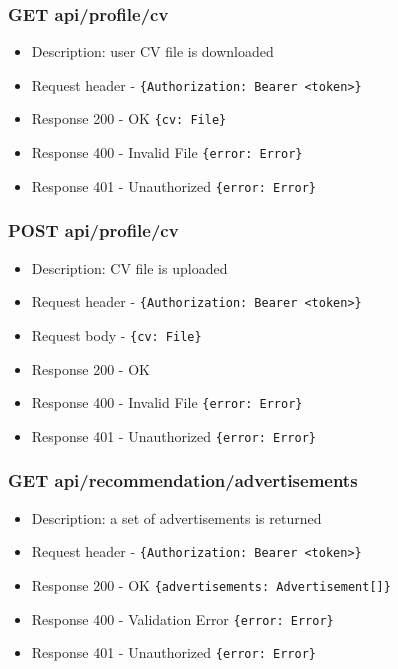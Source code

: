 \subsubsection{GET api/profile/cv}
\begin{itemize}
    \item Description: user CV file is downloaded
    \item Request header - \verb|{Authorization: Bearer <token>}|
    \item Response 200 - OK \verb|{cv: File}|
    \item Response 400 - Invalid File \verb|{error: Error}|
    \item Response 401 - Unauthorized \verb|{error: Error}|
\end{itemize}

\subsubsection{POST api/profile/cv}
\begin{itemize}
    \item Description: CV file is uploaded
    \item Request header - \verb|{Authorization: Bearer <token>}|
    \item Request body - \verb|{cv: File}|
    \item Response 200 - OK
    \item Response 400 - Invalid File \verb|{error: Error}|
    \item Response 401 - Unauthorized \verb|{error: Error}|
\end{itemize}

\subsubsection{GET api/recommendation/advertisements}
\begin{itemize}
    \item Description: a set of advertisements is returned
    \item Request header - \verb|{Authorization: Bearer <token>}|
    \item Response 200 - OK \verb|{advertisements: Advertisement[]}|
    \item Response 400 - Validation Error \verb|{error: Error}|
    \item Response 401 - Unauthorized \verb|{error: Error}|
\end{itemize}

